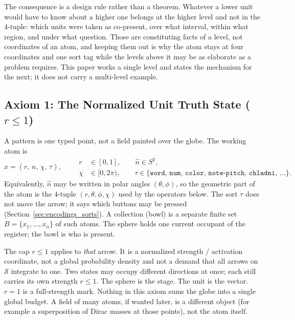 \documentclass[12pt, a4paper]{article}
\begin{document}
The consequence is a design rule rather than a theorem. Whatever a
lower unit would have to know about a higher one belongs at the higher
level and not in the 4-tuple: which units were taken as co-present,
over what interval, within what region, and under what question. Those
are constituting facts of a level, not coordinates of an atom, and
keeping them out is why the atom stays at four coordinates and one
sort tag while the levels above it may be as elaborate as a problem
requires. This paper works a single level and states the mechanism for
the next; it does not carry a multi-level example.

\subsection{Axiom 1: The Normalized Unit Truth State ($r \le 1$)}
\label{subsec:axiom1}
A pattern is one typed point, not a field painted over the globe. The working atom is
\begin{equation}
    x = (r,\,\hat n,\,\chi,\,\tau),
    \qquad
    \begin{aligned}
    r &\in [0,1],
    \qquad
    \hat n \in S^2,\\
    \chi &\in [0,2\pi),
    \qquad
    \tau \in \{\mathtt{word},\,\mathtt{num},\,\mathtt{color},\,\mathtt{note\text{-}pitch},\,\mathtt{chladni},\,\ldots\}.
    \end{aligned}
    \label{eq:unit_truth}
\end{equation}
Equivalently, $\hat n$ may be written in polar angles $(\theta,\phi)$, so the geometric part of the atom is the 4-tuple $(r,\theta,\phi,\chi)$ used by the operators below. The sort $\tau$ does not move the arrow; it says which buttons may be pressed (Section~\ref{sec:encodings_sorts}). A collection (bowl) is a separate finite set $B=\{x_1,\ldots,x_n\}$ of such atoms. The sphere holds one current occupant of the register; the bowl is who is present.

The cap $r \le 1$ applies to \emph{that} arrow. It is a normalized strength / activation coordinate, not a global probability density and not a demand that all arrows on $\mathcal{S}$ integrate to one. Two states may occupy
different directions at once; each still carries its own strength
$r\le 1$. The sphere is the stage. The unit is the vector.
$r=1$ is a full-strength mark. Nothing in this axiom sums the globe
into a single global budget. A field of many atoms, if wanted later, is a different object (for example a superposition of Dirac masses at those points), not the atom itself.
\end{document}
